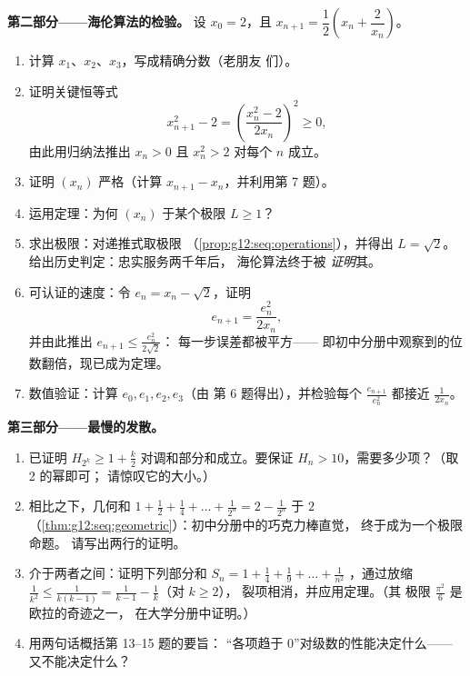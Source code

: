 \begin{problem}
\medskip
\noindent\textbf{第二部分——海伦算法的检验。}
设 $x_0 = 2$，且 $x_{n+1} = \dfrac12\left(x_n +
\dfrac{2}{x_n}\right)$。
\begin{enumerate}[resume]
  \item 计算 $x_1$、$x_2$、$x_3$，写成精确分数（老朋友
        们）。
  \item 证明关键恒等式
        \[
        x_{n+1}^2 - 2 = \left(\frac{x_n^2 - 2}{2x_n}\right)^{\!2}
        \geq 0,
        \]
        由此用归纳法推出 $x_n > 0$ 且
        $x_n^2 > 2$ 对每个 $n$ 成立。
  \item 证明 $(x_n)$ 严格（计算
        $x_{n+1} - x_n$，并利用第 7 题）。
  \item 运用定理：为何
        $(x_n)$ 于某个极限 $L \geq 1$？
  \item 求出极限：对递推式取极限
        （\cref{prop:g12:seq:operations}），并得出
        $L = \sqrt2$。给出历史判定：忠实服务两千年后，
        海伦算法终于被
        \emph{证明}其。
  \item 可认证的速度：令 $e_n = x_n - \sqrt2$，证明
        \[
        e_{n+1} = \frac{e_n^2}{2 x_n} ,
        \]
        并由此推出 $e_{n+1} \leq \frac{e_n^2}{2\sqrt2}$：
        每一步误差都被平方——
        即初中分册中观察到的位数翻倍，现已成为定理。
  \item 数值验证：计算 $e_0, e_1, e_2, e_3$（由
        第 6 题得出），并检验每个 $\frac{e_{n+1}}{e_n^2}$
        都接近 $\frac{1}{2x_n}$。
\end{enumerate}

\medskip
\noindent\textbf{第三部分——最慢的发散。}
\begin{enumerate}[resume]
  \item {} 已证明
        $H_{2^k} \geq 1 + \frac k2$ 对调和部分和成立。要保证
        $H_n > 10$，需要多少项？（取 2 的幂即可；
        请惊叹它的大小。）
  \item 相比之下，几何和
        $1 + \frac12 + \frac14 + \dots + \frac{1}{2^n} =
        2 - \frac{1}{2^n}$ 于 $2$
        （\cref{thm:g12:seq:geometric}）：初中分册中的巧克力棒直觉，
        终于成为一个极限命题。
        请写出两行的证明。
  \item 介于两者之间：证明下列部分和
        $S_n = 1 + \frac{1}{4} + \frac{1}{9} + \dots +
        \frac{1}{n^2}$ ，通过放缩
        $\frac{1}{k^2} \leq \frac{1}{k(k-1)} =
        \frac{1}{k-1} - \frac{1}{k}$（对 $k \geq 2$），
        裂项相消，并应用定理。（其
        极限 $\frac{\pi^2}{6}$ 是欧拉的奇迹之一，
        在大学分册中证明。）
  \item 用两句话概括第 13--15 题的要旨：
        “各项趋于 $0$”对级数的性能决定什么——
        又不能决定什么？
\end{enumerate}


\end{problem}
